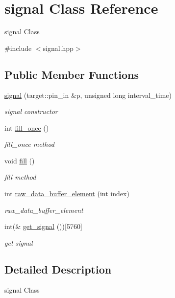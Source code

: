 \hypertarget{classsignal}{}\section{signal Class Reference}
\label{classsignal}


signal Class  




{\ttfamily \#include $<$signal.\+hpp$>$}

\subsection*{Public Member Functions}
\begin{DoxyCompactItemize}
\item 
\hyperlink{classsignal_aa068699a62bd006f86bc19a0c5661392}{signal} (target\+::pin\+\_\+in \&p, unsigned long interval\+\_\+time)
\begin{DoxyCompactList}\small\item\em signal constructor \end{DoxyCompactList}\item 
int \hyperlink{classsignal_a628ebb9790ffc436aa5fcab324f532a2}{fill\+\_\+once} ()
\begin{DoxyCompactList}\small\item\em fill\+\_\+once method \end{DoxyCompactList}\item 
void \hyperlink{classsignal_a3ed2a8274e37c64d00b59215ad1c823f}{fill} ()
\begin{DoxyCompactList}\small\item\em fill method \end{DoxyCompactList}\item 
int \hyperlink{classsignal_a8636d01cd5d34d71b2ff12caa36292d2}{raw\+\_\+data\+\_\+buffer\+\_\+element} (int index)
\begin{DoxyCompactList}\small\item\em raw\+\_\+data\+\_\+buffer\+\_\+element \end{DoxyCompactList}\item 
int(\& \hyperlink{classsignal_a8db7e128db78990e31d8a62891b6ef4a}{get\+\_\+signal} ())\mbox{[}5760\mbox{]}
\begin{DoxyCompactList}\small\item\em get signal \end{DoxyCompactList}\end{DoxyCompactItemize}


\subsection{Detailed Description}
signal Class 

